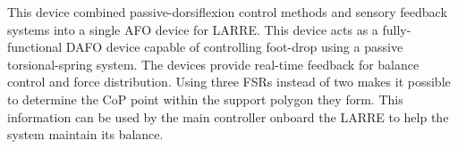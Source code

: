 This device combined passive-dorsiflexion control methods and sensory feedback systems into a single AFO device for LARRE. This device acts as a fully-functional DAFO device capable of controlling foot-drop using a passive torsional-spring system. The devices provide real-time feedback for balance control and force distribution.  Using three FSRs instead of two makes it possible to determine the CoP point within the support polygon they form.  This information can be used by the main controller onboard the LARRE to help the system maintain its balance.

